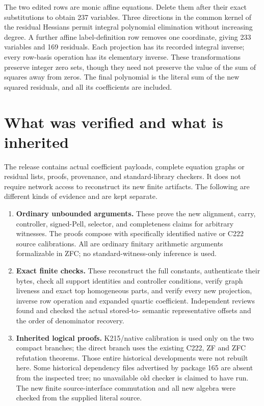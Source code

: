\documentclass[10pt,letterpaper]{article}
\theoremstyle{remark}\newtheorem{remark}[theorem]{Remark}
\begin{document}
The two edited rows are monic affine equations. Delete them after their
exact substitutions to obtain 237 variables. Three directions in the
common kernel of the residual Hessians permit integral polynomial
elimination without increasing degree. A further affine label-definition
row removes one coordinate, giving 233 variables and 169 residuals.
Each projection has its recorded integral inverse; every row-basis
operation has its elementary inverse. These transformations preserve
integer zero sets, though they need not preserve the value of the sum
of squares away from zeros. The final polynomial is the literal sum
of the new squared residuals, and all its coefficients are included.

\section{What was verified and what is inherited}

The release contains actual coefficient payloads, complete equation graphs
or residual lists, proofs, provenance, and standard-library checkers. It
does not require network access to reconstruct its new finite artifacts.
The following are different kinds of evidence and are kept separate.

\begin{enumerate}
\item \textbf{Ordinary unbounded arguments.} These prove the new alignment,
carry, controller, signed-Pell, selector, and completeness claims for
arbitrary witnesses. The proofs compose with specifically identified
native or C222 source calibrations. All are ordinary finitary arithmetic
arguments formalizable in ZFC; no standard-witness-only inference is used.
\item \textbf{Exact finite checks.} These reconstruct the full constants,
authenticate their bytes, check all support identities and controller
conditions, verify graph liveness and exact top homogeneous parts, and
verify every new projection, inverse row operation and expanded quartic
coefficient. Independent reviews found and checked the actual stored-to-
semantic representative offsets and the order of denominator recovery.
\item \textbf{Inherited logical proofs.} K215/native calibration is used
only on the two compact branches; the direct branch uses the existing
C222, ZF and ZFC refutation theorems. Those entire historical developments
were not rebuilt here. Some historical dependency files advertised by
package 165 are absent from the inspected tree; no unavailable old checker
is claimed to have run. The new finite source-interface commutation and
all new algebra were checked from the supplied literal source.
\end{enumerate}
\end{document}
